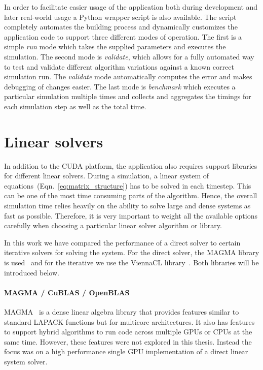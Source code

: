 In order to facilitate easier usage of the application both during development and later real-world usage a Python wrapper script is also available. The script completely automates the building process and dynamically customizes the application code to support three different modes of operation. The first is a simple \emph{run} mode which takes the supplied parameters and executes the simulation. The second mode is \emph{validate}, which allows for a fully automated way to test and validate different algorithm variations against a known correct simulation run. The \emph{validate} mode automatically computes the error and makes debugging of changes easier. The last mode is \emph{benchmark} which executes a particular simulation multiple times and collects and aggregates the timings for each simulation step as well as the total time.

\section{Linear solvers}
In addition to the CUDA platform, the application also requires support libraries for different linear solvers. During a simulation, a linear system of equations~(Eqn.~\eqref{eq:matrix_structure}) has to be solved in each timestep. This can be one of the most time consuming parts of the algorithm. Hence, the overall simulation time relies heavily on the ability to solve large and dense systems as fast as possible. Therefore, it is very important to weight all the available options carefully when choosing a particular linear solver algorithm or library.

In this work we have compared the performance of a direct solver to certain iterative solvers for solving the system. For the direct solver, the MAGMA library is used~\cite{MagmaDocumentation} and for the iterative we use the ViennaCL library~\cite{ViennaCLDocumentation}. Both libraries will be introduced below.

\paragraph{MAGMA / CuBLAS / OpenBLAS}
MAGMA~\cite{MagmaDocumentation} is a dense linear algebra library that provides features similar to standard LAPACK functions but for multicore architectures. It also has features to support hybrid algorithms to run code across multiple GPUs or CPUs at the same time. However, these features were not explored in this thesis. Instead the focus was on a high performance single GPU implementation of a direct linear system solver.

